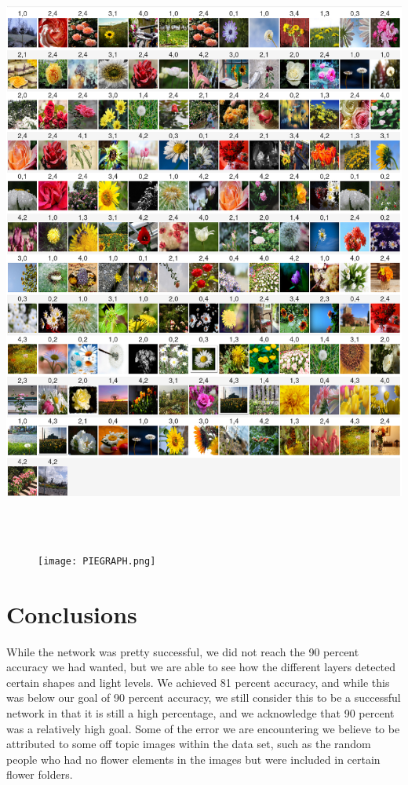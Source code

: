 \documentclass{article}
\begin{document}

\includegraphics[width=1.0\linewidth]{WRONGUSE.png}


\hfill \\
\hfill \\


\begin{figure}
\texttt{[image: PIEGRAPH.png]} 
\label{fig:wrapfig}
\end{figure}

\section{Conclusions}
While the network was pretty successful, we did not reach the 90 percent accuracy we had wanted, but we are able to see how the different layers detected certain shapes and light levels. We achieved 81 percent accuracy, and while this was below our goal of 90 percent accuracy, we still consider this to be a successful network in that it is still a high percentage, and we acknowledge that 90 percent was a relatively high goal. Some of the error we are encountering we believe to be attributed to some off topic images within the data set, such as the random people who had no flower elements in the images but were included in certain flower folders.
\end{document}
